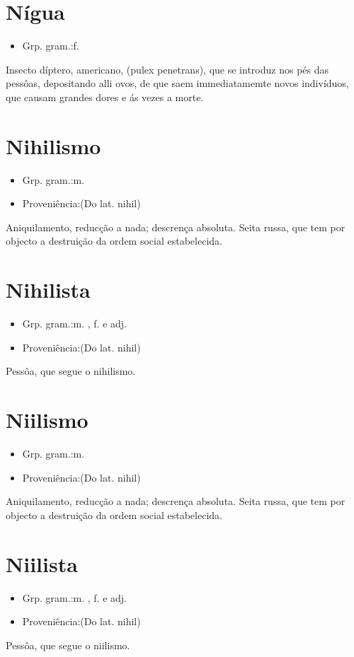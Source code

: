 \section{Nígua}
\begin{itemize}
\item {Grp. gram.:f.}
\end{itemize}
Insecto díptero, americano, (\textunderscore pulex penetrans\textunderscore ), que se introduz nos pés das pessôas, depositando alli ovos, de que saem immediatamemte novos indivíduos, que causam grandes dores e ás vezes a morte.
\section{Nihilismo}
\begin{itemize}
\item {Grp. gram.:m.}
\end{itemize}
\begin{itemize}
\item {Proveniência:(Do lat. \textunderscore nihil\textunderscore )}
\end{itemize}
Aniquilamento, reducção a nada; descrença absoluta.
Seita russa, que tem por objecto a destruição da ordem social estabelecida.
\section{Nihilista}
\begin{itemize}
\item {Grp. gram.:m. ,  f.  e  adj.}
\end{itemize}
\begin{itemize}
\item {Proveniência:(Do lat. \textunderscore nihil\textunderscore )}
\end{itemize}
Pessôa, que segue o nihilismo.
\section{Niilismo}
\begin{itemize}
\item {Grp. gram.:m.}
\end{itemize}
\begin{itemize}
\item {Proveniência:(Do lat. \textunderscore nihil\textunderscore )}
\end{itemize}
Aniquilamento, reducção a nada; descrença absoluta.
Seita russa, que tem por objecto a destruição da ordem social estabelecida.
\section{Niilista}
\begin{itemize}
\item {Grp. gram.:m. ,  f.  e  adj.}
\end{itemize}
\begin{itemize}
\item {Proveniência:(Do lat. \textunderscore nihil\textunderscore )}
\end{itemize}
Pessôa, que segue o niilismo.
